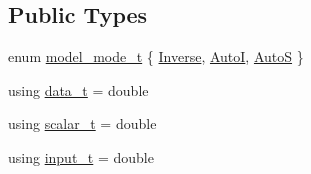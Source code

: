 \subsection*{Public Types}
\begin{DoxyCompactItemize}
\item 
enum \hyperlink{classlbann_1_1data__reader__jag_a114c369c8604df385cf7a3ec20c9739b}{model\+\_\+mode\+\_\+t} \{ \hyperlink{classlbann_1_1data__reader__jag_a114c369c8604df385cf7a3ec20c9739ba2d3bba9f202270762169c1c01d2fb7a4}{Inverse}, 
\hyperlink{classlbann_1_1data__reader__jag_a114c369c8604df385cf7a3ec20c9739bae9c49fc4443020e18086fc83ce0b369b}{AutoI}, 
\hyperlink{classlbann_1_1data__reader__jag_a114c369c8604df385cf7a3ec20c9739baab2b8e8bef02dfc8ffaae80bdd0a7fd4}{AutoS}
 \}
\item 
using \hyperlink{classlbann_1_1data__reader__jag_a7377d6c02c455f019a378489b9b8eab4}{data\+\_\+t} = double
\item 
using \hyperlink{classlbann_1_1data__reader__jag_aa2e01bc071588b9c1a583e5a752abcc6}{scalar\+\_\+t} = double
\item 
using \hyperlink{classlbann_1_1data__reader__jag_ab08c9af4bca496b7889de1473c3d8d4e}{input\+\_\+t} = double
\end{DoxyCompactItemize}
